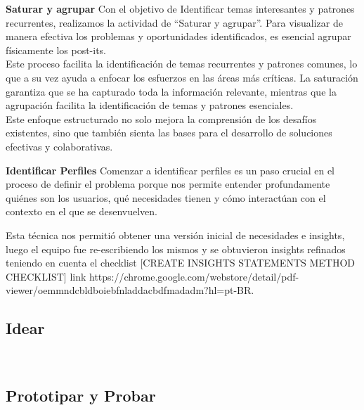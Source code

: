 \textbf{Saturar y agrupar}
Con el objetivo de Identificar temas interesantes y patrones recurrentes, realizamos la actividad de “Saturar y agrupar”. Para visualizar de manera efectiva los problemas y oportunidades identificados, es 
esencial agrupar físicamente los post-its.\\
Este proceso facilita la identificación de temas recurrentes y patrones comunes, lo que a su vez ayuda a enfocar los esfuerzos en las áreas más críticas. La saturación garantiza que se ha capturado toda la 
información relevante, mientras que la agrupación facilita la identificación de temas y patrones esenciales.\\
Este enfoque estructurado no solo mejora la comprensión de los desafíos existentes, sino que también sienta las bases para el desarrollo de soluciones efectivas y colaborativas.


\textbf{Identificar Perfiles}
Comenzar a identificar perfiles es un paso crucial en el proceso de definir el problema porque nos permite entender profundamente quiénes son los usuarios, qué necesidades tienen y cómo interactúan con el 
contexto en el que se desenvuelven.

Esta técnica nos permitió obtener una versión inicial de necesidades e insights, luego el equipo fue re-escribiendo los mismos y se obtuvieron insights refinados teniendo en cuenta el checklist 
[CREATE INSIGHTS STATEMENTS METHOD CHECKLIST] link https://chrome.google.com/webstore/detail/pdf-viewer/oemmndcbldboiebfnladdacbdfmadadm?hl=pt-BR.


\subsection{Idear}\\


\subsection{Prototipar y Probar}\\
